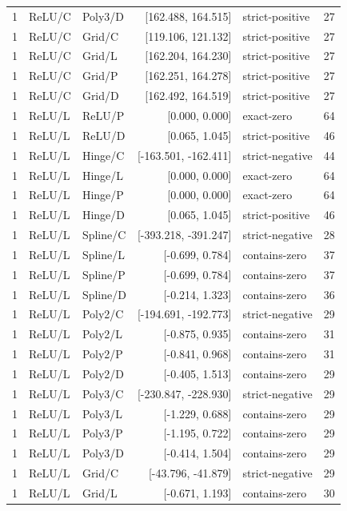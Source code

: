 \begin{longtable}{lllrlr}
1 & ReLU/C & Poly3/D & [162.488, 164.515] & strict-positive & 27 \\
1 & ReLU/C & Grid/C & [119.106, 121.132] & strict-positive & 27 \\
1 & ReLU/C & Grid/L & [162.204, 164.230] & strict-positive & 27 \\
1 & ReLU/C & Grid/P & [162.251, 164.278] & strict-positive & 27 \\
1 & ReLU/C & Grid/D & [162.492, 164.519] & strict-positive & 27 \\
1 & ReLU/L & ReLU/P & [0.000, 0.000] & exact-zero & 64 \\
1 & ReLU/L & ReLU/D & [0.065, 1.045] & strict-positive & 46 \\
1 & ReLU/L & Hinge/C & [-163.501, -162.411] & strict-negative & 44 \\
1 & ReLU/L & Hinge/L & [0.000, 0.000] & exact-zero & 64 \\
1 & ReLU/L & Hinge/P & [0.000, 0.000] & exact-zero & 64 \\
1 & ReLU/L & Hinge/D & [0.065, 1.045] & strict-positive & 46 \\
1 & ReLU/L & Spline/C & [-393.218, -391.247] & strict-negative & 28 \\
1 & ReLU/L & Spline/L & [-0.699, 0.784] & contains-zero & 37 \\
1 & ReLU/L & Spline/P & [-0.699, 0.784] & contains-zero & 37 \\
1 & ReLU/L & Spline/D & [-0.214, 1.323] & contains-zero & 36 \\
1 & ReLU/L & Poly2/C & [-194.691, -192.773] & strict-negative & 29 \\
1 & ReLU/L & Poly2/L & [-0.875, 0.935] & contains-zero & 31 \\
1 & ReLU/L & Poly2/P & [-0.841, 0.968] & contains-zero & 31 \\
1 & ReLU/L & Poly2/D & [-0.405, 1.513] & contains-zero & 29 \\
1 & ReLU/L & Poly3/C & [-230.847, -228.930] & strict-negative & 29 \\
1 & ReLU/L & Poly3/L & [-1.229, 0.688] & contains-zero & 29 \\
1 & ReLU/L & Poly3/P & [-1.195, 0.722] & contains-zero & 29 \\
1 & ReLU/L & Poly3/D & [-0.414, 1.504] & contains-zero & 29 \\
1 & ReLU/L & Grid/C & [-43.796, -41.879] & strict-negative & 29 \\
1 & ReLU/L & Grid/L & [-0.671, 1.193] & contains-zero & 30 \\

\end{longtable}
